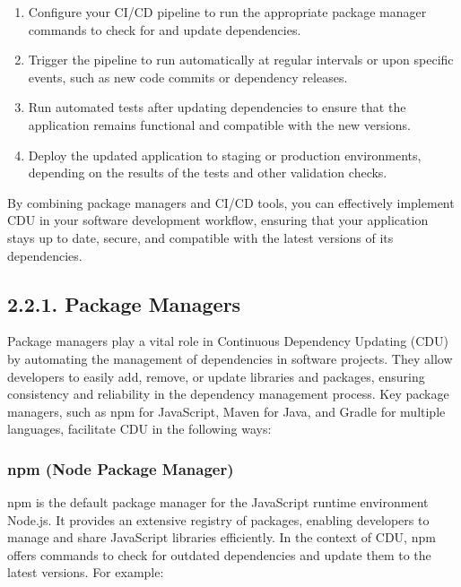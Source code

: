 \documentclass[10pt]{article}
\begin{document}
\begin{enumerate}

  \item Configure your CI/CD pipeline to run the appropriate package manager commands to check for and update dependencies.

  \item Trigger the pipeline to run automatically at regular intervals or upon specific events, such as new code commits or dependency releases.

  \item Run automated tests after updating dependencies to ensure that the application remains functional and compatible with the new versions.

  \item Deploy the updated application to staging or production environments, depending on the results of the tests and other validation checks.

\end{enumerate}

By combining package managers and CI/CD tools, you can effectively implement CDU in your software development workflow, ensuring that your application stays up to date, secure, and compatible with the latest versions of its dependencies.

\subsection*{2.2.1. Package Managers}

Package managers play a vital role in Continuous Dependency Updating (CDU) by automating the management of dependencies in software projects. They allow developers to easily add, remove, or update libraries and packages, ensuring consistency and reliability in the dependency management process. Key package managers, such as npm for JavaScript, Maven for Java, and Gradle for multiple languages, facilitate CDU in the following ways:

\subsubsection*{npm (Node Package Manager)}

npm is the default package manager for the JavaScript runtime environment Node.js. It provides an extensive registry of packages, enabling developers to manage and share JavaScript libraries efficiently. In the context of CDU, npm offers commands to check for outdated dependencies and update them to the latest versions. For example:
\end{document}
